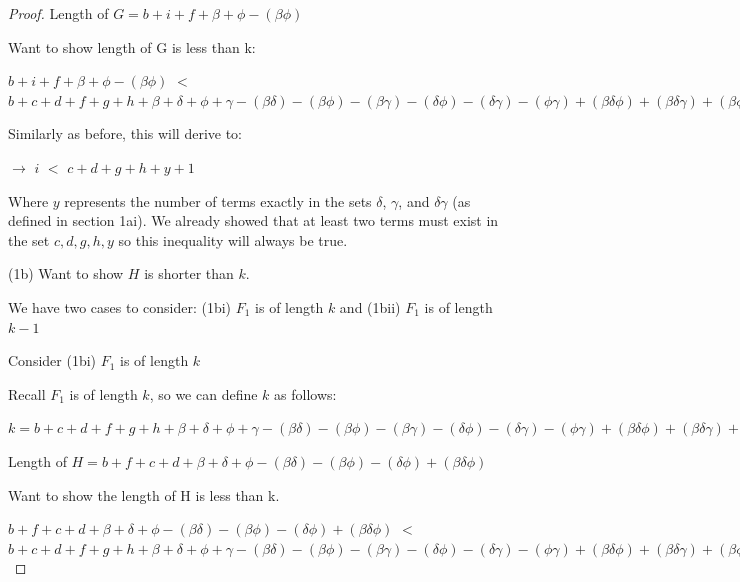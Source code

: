 \documentclass[manuscript]{acmart}
\begin{document}
\begin{proof}
        Length of $G = b + i + f + \beta + \phi - (\beta \phi)$

        Want to show length of G is less than k:

        $b + i + f + \beta + \phi - (\beta \phi)$
        $<$
        $b + c + d + f + g + h 
        + \beta + \delta + \phi + \gamma
        - (\beta \delta) - (\beta \phi) - (\beta \gamma) - (\delta \phi) - (\delta \gamma) - (\phi \gamma)
        + (\beta \delta \phi) + (\beta \delta \gamma) + (\beta \phi \gamma) + (\delta \phi \gamma)
        - (\beta \delta \phi \gamma) 
        + 1
        $

        Similarly as before, this will derive to:

        $\rightarrow$ $i$
        $<$
        $c + d + g + h + y
        + 1
        $

        Where $y$ represents the number of terms exactly in the sets $\delta$, $\gamma$, and $\delta \gamma$ (as defined in section 1ai). We already showed that at least two terms must exist in the set {$c, d, g, h, y$} so this inequality will always be true.

        (1b) Want to show $H$ is shorter than $k$.

        We have two cases to consider: (1bi) $F_1$ is of length $k$ and (1bii) $F_1$ is of length $k-1$

        Consider (1bi) $F_1$ is of length $k$

        Recall $F_1$ is of length $k$, so we can define $k$ as follows:

        $k = b + c + d + f + g + h 
        + \beta + \delta + \phi + \gamma
        - (\beta \delta) - (\beta \phi) - (\beta \gamma) - (\delta \phi) - (\delta \gamma) - (\phi \gamma)
        + (\beta \delta \phi) + (\beta \delta \gamma) + (\beta \phi \gamma) + (\delta \phi \gamma)
        - (\beta \delta \phi \gamma)
        $

        Length of $H = b + f + c + d 
        + \beta + \delta + \phi
        - (\beta \delta) - (\beta \phi) - (\delta \phi)
        + (\beta \delta \phi) $

        Want to show the length of H is less than k.

        $b + f + c + d 
        + \beta + \delta + \phi
        - (\beta \delta) - (\beta \phi) - (\delta \phi)
        + (\beta \delta \phi) $
        $<$
        $b + c + d + f + g + h 
        + \beta + \delta + \phi + \gamma
        - (\beta \delta) - (\beta \phi) - (\beta \gamma) - (\delta \phi) - (\delta \gamma) - (\phi \gamma)
        + (\beta \delta \phi) + (\beta \delta \gamma) + (\beta \phi \gamma) + (\delta \phi \gamma)
        - (\beta \delta \phi \gamma)
        $


\end{proof}
\end{document}
